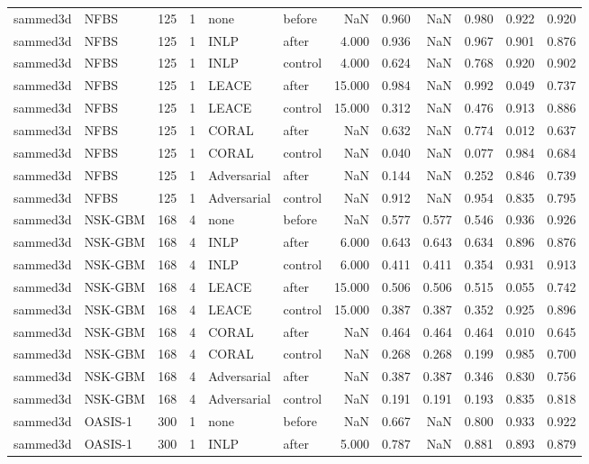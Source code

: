 \begin{tabular}{llrrllrrrrrr}
sammed3d & NFBS & 125 & 1 & none & before & NaN & 0.960 & NaN & 0.980 & 0.922 & 0.920 \\
sammed3d & NFBS & 125 & 1 & INLP & after & 4.000 & 0.936 & NaN & 0.967 & 0.901 & 0.876 \\
sammed3d & NFBS & 125 & 1 & INLP & control & 4.000 & 0.624 & NaN & 0.768 & 0.920 & 0.902 \\
sammed3d & NFBS & 125 & 1 & LEACE & after & 15.000 & 0.984 & NaN & 0.992 & 0.049 & 0.737 \\
sammed3d & NFBS & 125 & 1 & LEACE & control & 15.000 & 0.312 & NaN & 0.476 & 0.913 & 0.886 \\
sammed3d & NFBS & 125 & 1 & CORAL & after & NaN & 0.632 & NaN & 0.774 & 0.012 & 0.637 \\
sammed3d & NFBS & 125 & 1 & CORAL & control & NaN & 0.040 & NaN & 0.077 & 0.984 & 0.684 \\
sammed3d & NFBS & 125 & 1 & Adversarial & after & NaN & 0.144 & NaN & 0.252 & 0.846 & 0.739 \\
sammed3d & NFBS & 125 & 1 & Adversarial & control & NaN & 0.912 & NaN & 0.954 & 0.835 & 0.795 \\
sammed3d & NSK-GBM & 168 & 4 & none & before & NaN & 0.577 & 0.577 & 0.546 & 0.936 & 0.926 \\
sammed3d & NSK-GBM & 168 & 4 & INLP & after & 6.000 & 0.643 & 0.643 & 0.634 & 0.896 & 0.876 \\
sammed3d & NSK-GBM & 168 & 4 & INLP & control & 6.000 & 0.411 & 0.411 & 0.354 & 0.931 & 0.913 \\
sammed3d & NSK-GBM & 168 & 4 & LEACE & after & 15.000 & 0.506 & 0.506 & 0.515 & 0.055 & 0.742 \\
sammed3d & NSK-GBM & 168 & 4 & LEACE & control & 15.000 & 0.387 & 0.387 & 0.352 & 0.925 & 0.896 \\
sammed3d & NSK-GBM & 168 & 4 & CORAL & after & NaN & 0.464 & 0.464 & 0.464 & 0.010 & 0.645 \\
sammed3d & NSK-GBM & 168 & 4 & CORAL & control & NaN & 0.268 & 0.268 & 0.199 & 0.985 & 0.700 \\
sammed3d & NSK-GBM & 168 & 4 & Adversarial & after & NaN & 0.387 & 0.387 & 0.346 & 0.830 & 0.756 \\
sammed3d & NSK-GBM & 168 & 4 & Adversarial & control & NaN & 0.191 & 0.191 & 0.193 & 0.835 & 0.818 \\
sammed3d & OASIS-1 & 300 & 1 & none & before & NaN & 0.667 & NaN & 0.800 & 0.933 & 0.922 \\
sammed3d & OASIS-1 & 300 & 1 & INLP & after & 5.000 & 0.787 & NaN & 0.881 & 0.893 & 0.879 \\

\end{tabular}
